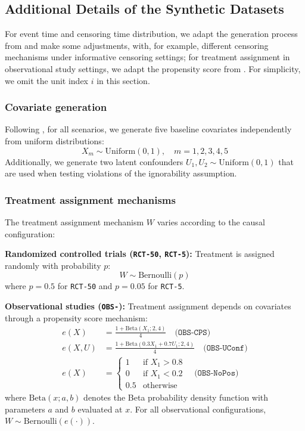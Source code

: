 \subsection{Additional Details of the Synthetic Datasets}\label{ch04:app:synthetic-dataset}

For event time and censoring time distribution, we adapt the generation process from \citet{meir2025heterogeneous} and make some adjustments, with, for example, different censoring mechanisms under informative censoring settings; for treatment assignment in observational study settings, we adapt the propensity score from \citet{ch04:cui2023estimating}.
For simplicity, we omit the unit index $i$ in this section.

\subsubsection{Covariate generation}
Following \citet{ch04:cui2023estimating,meir2025heterogeneous}, for all scenarios, we generate five baseline covariates independently from uniform distributions:
\begin{equation*}
X_m \sim \text{Uniform}(0,1), \quad m = 1, 2, 3, 4, 5
\end{equation*}
Additionally, we generate two latent confounders $U_1, U_2 \sim \text{Uniform}(0,1)$ that are used when testing violations of the ignorability assumption.

\subsubsection{Treatment assignment mechanisms}
The treatment assignment mechanism $W$ varies according to the causal configuration:

\textbf{Randomized controlled trials (\texttt{RCT-50}, \texttt{RCT-5}):} Treatment is assigned randomly with probability $p$:
\begin{equation*}
W \sim \text{Bernoulli}(p)
\end{equation*}
where $p = 0.5$ for \texttt{RCT-50} and $p = 0.05$ for \texttt{RCT-5}.

\textbf{Observational studies (\texttt{OBS-}):} Treatment assignment depends on covariates through a propensity score mechanism:
\begin{align*}
e(X) &= \frac{1 + \text{Beta}(X_{1}; 2, 4)}{4} \quad \texttt{(OBS-CPS)} \\
e(X, U) &= \frac{1 + \text{Beta}(0.3X_{1} + 0.7U_{1}; 2, 4)}{4} \quad \texttt{(OBS-UConf)} \\
e(X) &= \begin{cases} 
1 & \text{if } X_{1} > 0.8 \\
0 & \text{if } X_{1} < 0.2 \\
0.5 & \text{otherwise}
\end{cases} \quad \texttt{(OBS-NoPos)}
\end{align*}
where $\text{Beta}(x; a, b)$ denotes the Beta probability density function with parameters $a$ and $b$ evaluated at $x$.
For all observational configurations, $W \sim \text{Bernoulli}(e(\cdot))$.

